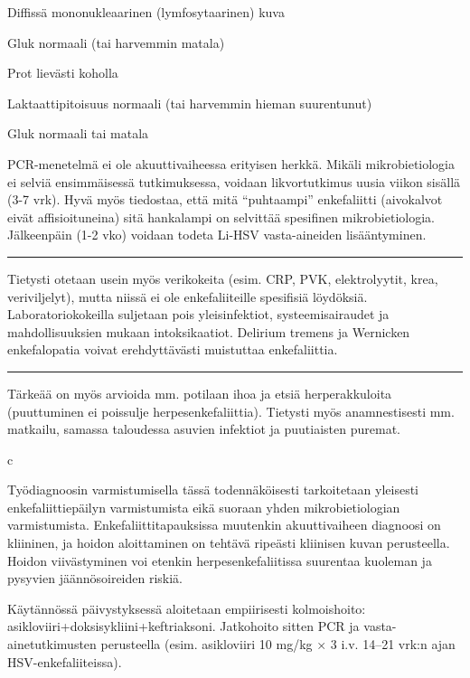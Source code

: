 \documentclass[
]{book}
\begin{document}
Diffissä mononukleaarinen (lymfosytaarinen) kuva

Gluk normaali (tai harvemmin matala)

Prot lievästi koholla

Laktaattipitoisuus normaali (tai harvemmin hieman suurentunut)

Gluk normaali tai matala

PCR-menetelmä ei ole akuuttivaiheessa erityisen herkkä. Mikäli mikrobietiologia ei selviä ensimmäisessä tutkimuksessa, voidaan likvortutkimus uusia viikon sisällä (3-7 vrk). Hyvä myös tiedostaa, että mitä ``puhtaampi'' enkefaliitti (aivokalvot eivät affisioituneina) sitä hankalampi on selvittää spesifinen mikrobietiologia. Jälkeenpäin (1-2 vko) voidaan todeta Li-HSV vasta-aineiden
lisääntyminen.

\begin{center}\rule{0.5\linewidth}{0.5pt}\end{center}

Tietysti otetaan usein myös verikokeita (esim. CRP, PVK, elektrolyytit, krea, veriviljelyt), mutta niissä ei ole enkefaliiteille spesifisiä löydöksiä. Laboratoriokokeilla suljetaan pois yleisinfektiot, systeemisairaudet ja mahdollisuuksien mukaan intoksikaatiot. Delirium tremens ja Wernicken enkefalopatia voivat erehdyttävästi muistuttaa enkefaliittia.

\begin{center}\rule{0.5\linewidth}{0.5pt}\end{center}

Tärkeää on myös arvioida mm. potilaan ihoa ja etsiä herperakkuloita (puuttuminen ei poissulje herpesenkefaliittia). Tietysti myös anamnestisesti mm. matkailu, samassa taloudessa asuvien infektiot ja puutiaisten puremat.

c

Työdiagnoosin varmistumisella tässä todennäköisesti tarkoitetaan yleisesti enkefaliittiepäilyn varmistumista eikä suoraan yhden mikrobietiologian varmistumista. Enkefaliittitapauksissa muutenkin akuuttivaiheen diagnoosi on kliininen, ja hoidon aloittaminen on tehtävä ripeästi kliinisen kuvan perusteella. Hoidon viivästyminen voi etenkin herpesenkefaliitissa suurentaa kuoleman ja pysyvien jäännösoireiden riskiä.

Käytännössä päivystyksessä aloitetaan empiirisesti kolmoishoito: asikloviiri+doksisykliini+keftriaksoni. Jatkohoito sitten PCR ja vasta-ainetutkimusten perusteella (esim. asikloviiri 10 mg/kg × 3 i.v. 14--21 vrk:n ajan HSV-enkefaliiteissa).
\end{document}
